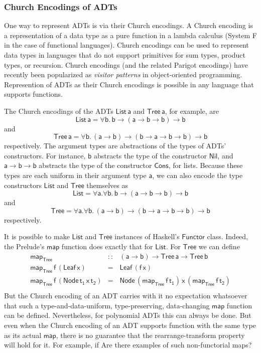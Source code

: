 \documentclass[acmsmall,screen,review,anonymous]{acmart}
\theoremstyle{definition}
\begin{document}
\subsubsection{Church Encodings of ADTs}

One way to represent ADTs is via their Church encodings. A Church
encoding is a representation of a data type as a pure function in a
lambda calculus (System F in the case of functional languages). Church
encodings can be used to represent data types in languages that do not
support primitives for sum types, product types, or recursion.
{\color{blue} Church encodings (and the related Parigot encodings)
  have recently been popularized as {\em visitor patterns} in
  object-oriented programming.} Represention of ADTs as their Church
encodings is possible in any language that supports functions.

The Church encodings of the ADTs $\mathsf{List\,a}$ and
$\mathsf{Tree\,a}$, for example, are
\[\mathsf{List\,a} = \mathsf{\forall b.\,b \to (a \to b \to b) \to b}\]
and 
\[\mathsf{Tree\,a} = \mathsf{\forall b.\,(a \to b) \to (b \to a \to b
  \to b) \to b}\] respectively. The argument types are abstractions
of the types of ADTs' constructors. For instance, $\mathsf{b}$
abstracts the type of the constructor $\mathsf{Nil}$, and $\mathsf{a
  \to b \to b}$ abstracts the type of the constructor $\mathsf{Cons}$,
for lists. Because these types are each uniform in their argument type
$\mathsf{a}$, we can also encode the type constructors $\mathsf{List}$
and $\mathsf{Tree}$ themselves as
\[\mathsf{List} = \mathsf{\forall a. \forall b.\,b \to (a \to b \to b)
  \to b}\] 
and 
\[\mathsf{Tree} = \mathsf{\forall a. \forall b.\,(a \to b) \to (b \to
  a \to b \to b) \to b}\]
respectively. 

It is possible to make $\mathsf{List}$ and $\mathsf{Tree}$ instances
of Haskell's $\mathsf{Functor}$ class. Indeed, the Prelude's
$\mathsf{map}$ function does exactly that for $\mathsf{List}$. For
$\mathsf{Tree}$ we can define
\[\begin{array}{lll}
\mathsf{map_{Tree}} & \mathsf{::} & \mathsf{(a \to b) \to Tree\,a \to Tree \,b}\\
\mathsf{map_{Tree}\, f\, (Leaf\,x)} & \mathsf{=} & \mathsf{Leaf\,(f\,x)}\\
\mathsf{map_{Tree}\, f\, (Node\,t_1\,x\,t_2)} & \mathsf{=} &
\mathsf{Node\,(map_{Tree}\, f \,t_1)\,x\,(map_{Tree}\,f\,t_2)}\\
\end{array}\]
But the Church encoding of an ADT carries with it no expectation
whatsoever that such a type-and-data-uniform, type-preserving,
data-changing $\mathsf{map}$ function can be defined. Nevertheless,
for polynomial ADTs this can always be done. But even when the Church
encoding of an ADT supports function with the same type as its actual
$\mathsf{map}$, there is no guarantee that the rearrange-transform
property will hold for it. For example, if {\color{violet} Are there
  examples of such non-functorial maps?}
\end{document}
